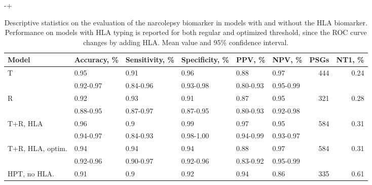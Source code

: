 \begin{table}
    \small
    \begin{adjustwidth*}{}{-\marginparwidth+\marginparsep}
    \caption[Narcolepsy biomarker performance]{Descriptive statistics on the evaluation of the narcolepsy biomarker in models with and without the \ac{HLA} biomarker. 
    Performance on models with \ac{HLA} typing is reported for both regular and optimized threshold, since the \ac{ROC} curve changes by adding \ac{HLA}. Mean value and 95\% confidence interval.}
    \label{tab:paperiii-supptable06}
    \begin{tabular}{@{}llllllrr@{}}
        \toprule
        \textbf{Model}      & \textbf{Accuracy}, \% & \textbf{Sensitivity}, \% & \textbf{Specificity}, \% & \textbf{PPV}, \%  & \textbf{NPV}, \%  & \textbf{\acp{PSG}} & \textbf{\ac{NT1}}, \% \\ \midrule
        T                   & 0.95          & 0.91             & 0.96             & 0.88      & 0.97      & 444       & 0.24                       \\
                            & 0.92-0.97     & 0.84-0.96        & 0.93-0.98        & 0.80-0.93 & 0.95-0.99 &           &                            \\
        R                   & 0.92          & 0.93             & 0.91             & 0.87      & 0.95      & 321       & 0.28                       \\
                            & 0.88-0.95     & 0.87-0.97        & 0.87-0.95        & 0.80-0.93 & 0.92-0.98 &           &                            \\
        \multirow[t]{2}{0.15\textwidth}{T+R, HLA} & 0.96          & 0.9              & 0.99             & 0.97      & 0.95      & 584       & 0.31                       \\
                            & 0.94-0.97     & 0.84-0.93        & 0.98-1.00        & 0.94-0.99 & 0.93-0.97 &           &                            \\
        \multirow[t]{2}{0.15\textwidth}{T+R, HLA, optim.}    & 0.94          & 0.94             & 0.94             & 0.88      & 0.97      & 584       & 0.31                       \\
                            & 0.92-0.96     & 0.90-0.97        & 0.92-0.96        & 0.83-0.92 & 0.95-0.99 &           &                            \\
        \multirow[t]{2}{0.15\textwidth}{HPT, no HLA.}        & 0.91          & 0.9              & 0.92             & 0.94      & 0.86      & 335       & 0.61                       \\

\end{tabular}
\end{adjustwidth*}
\end{table}
